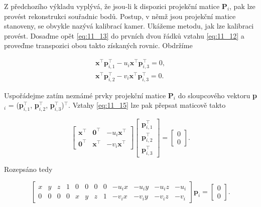 Z předchozího výkladu vyplývá, že jsou-li k dispozici projekční matice \textbf{P}$_i$, pak lze provést rekonstrukci souřadnic bodů. Postup, v němž jsou projekční matice stanoveny, se obvykle nazývá kalibrací kamer. Ukážeme metodu, jak lze kalibraci provést. Dosaďme opět \eqref{eq:11_13} do prvních dvou řádků vztahu \eqref{eq:11_12} a proveďme transpozici obou takto získaných rovnic. Obdržíme

\begin{equation} \label{eq:11_15}
    \begin{array}{l}
    {\mathbf{x}^\top \mathbf{p}_{i,1}^\top - u_{i} \mathbf{x}^\top \mathbf{p}_{i,3}^\top =0,} \\
    {\mathbf{x}^\top \mathbf{p}_{i,2}^\top - v_{i} \mathbf{x}^\top \mathbf{p}_{i,3}^\top =0.}
    \end{array}
\end{equation}

Uspořádejme zatím neznámé prvky projekční matice \textbf{P}$_i$ do sloupcového vektoru \textbf{p}$_{i}$ = (\textbf{p}$^\top_{i,1}$, \textbf{p}$^\top_{i,2}$, \textbf{p}$^\top_{i,3}$)$^\top$. Vztahy \eqref{eq:11_15} lze pak přepsat maticově takto

\begin{equation} \label{eq:11_16}
    \left[
    \begin{array}{ccc}
    {\mathbf{x}^\top} & {\mathbf{0}^\top} & {-u_{i} \mathbf{x}^\top} \\
    {\mathbf{0}^\top} & {\mathbf{x}^\top} & {-v_{i} \mathbf{x}^\top}
    \end{array}
    \right]
    \left[
    \begin{array}{c}
    {\mathbf{p}_{i,1}^\top} \\
    {\mathbf{p}_{i,2}^\top} \\
    {\mathbf{p}_{i,3}^\top}
    \end{array}
    \right]
    =
    \left[
    \begin{array}{c}
    {0} \\
    {0}
    \end{array}
    \right].  
\end{equation} 

Rozepsáno tedy

\begin{equation} \label{eq:11_17}
    \left[
    \begin{array}{cccccccccccc}
    {x} & {y} & {z} & {1} & {0} & {0} & {0} & {0} & {-u_{i} x} & {-u_{i} y} & {-u_{i} z} & {-u_{i}} \\
    {0} & {0} & {0} & {0} & {x} & {y} & {z} & {1} & {-v_{i} x} & {-v_{i} y} & {-v_{i} z} & {-v_{i}}
    \end{array}
    \right]
    \mathbf{p}_{i}
    =
    \left[
    \begin{array}{c}
    {0} \\
    {0}
    \end{array}
    \right].
\end{equation} 

